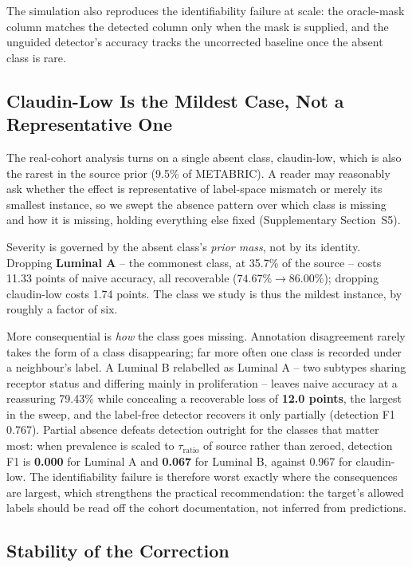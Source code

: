 \documentclass[10pt,journal,compsoc,twocolumn]{IEEEtran}
\begin{document}
The simulation also reproduces the identifiability failure at scale: the oracle-mask column matches the detected column only when the mask is supplied, and the unguided detector's accuracy tracks the uncorrected baseline once the absent class is rare.

\subsection{Claudin-Low Is the Mildest Case, Not a Representative One}
\label{sec:absence_generality}

The real-cohort analysis turns on a single absent class, claudin-low, which is also the rarest in the source prior (9.5\% of METABRIC). A reader may reasonably ask whether the effect is representative of label-space mismatch or merely its smallest instance, so we swept the absence pattern over which class is missing and how it is missing, holding everything else fixed (Supplementary Section~S5).

Severity is governed by the absent class's \emph{prior mass}, not by its identity. Dropping \textbf{Luminal A} -- the commonest class, at 35.7\% of the source -- costs 11.33 points of naive accuracy, all recoverable ($74.67\% \rightarrow 86.00\%$); dropping claudin-low costs 1.74 points. The class we study is thus the mildest instance, by roughly a factor of six.

More consequential is \emph{how} the class goes missing. Annotation disagreement rarely takes the form of a class disappearing; far more often one class is recorded under a neighbour's label. A Luminal B relabelled as Luminal A -- two subtypes sharing receptor status and differing mainly in proliferation -- leaves naive accuracy at a reassuring 79.43\% while concealing a recoverable loss of \textbf{12.0 points}, the largest in the sweep, and the label-free detector recovers it only partially (detection F1 0.767). Partial absence defeats detection outright for the classes that matter most: when prevalence is scaled to $\tau_{\text{ratio}}$ of source rather than zeroed, detection F1 is \textbf{0.000} for Luminal A and \textbf{0.067} for Luminal B, against 0.967 for claudin-low. The identifiability failure is therefore worst exactly where the consequences are largest, which strengthens the practical recommendation: the target's allowed labels should be read off the cohort documentation, not inferred from predictions.

\subsection{Stability of the Correction}
\end{document}
